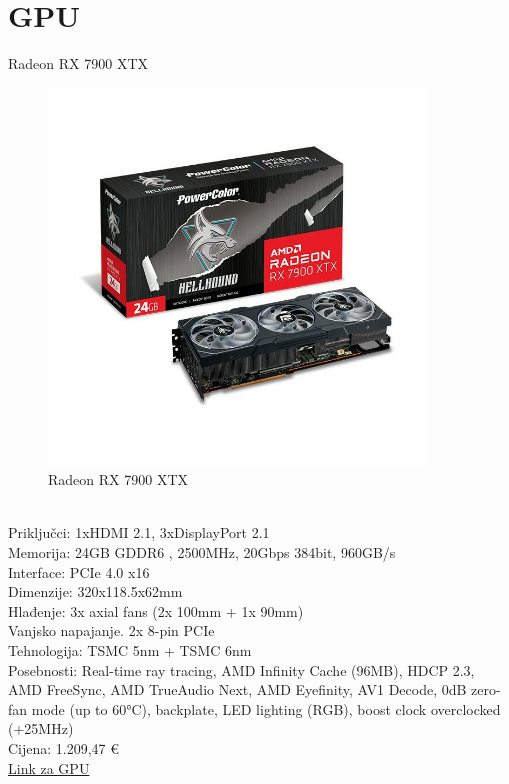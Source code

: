 \documentclass{article}
\begin{document}
\section{GPU}
Radeon RX 7900 XTX
\begin{figure}[h]
    \includegraphics[width=10cm]{rx7900.jpg}
    \caption{Radeon RX 7900 XTX}
\end{figure}\\
Priključci: 1xHDMI 2.1, 3xDisplayPort 2.1\\
Memorija: 24GB GDDR6 , 2500MHz, 20Gbps 384bit, 960GB/s\\
Interface: PCIe 4.0 x16\\
Dimenzije: 320x118.5x62mm\\
Hlađenje: 3x axial fans (2x 100mm + 1x 90mm)\\
Vanjsko napajanje. 2x 8-pin PCIe\\
Tehnologija: TSMC 5nm + TSMC 6nm\\
Posebnosti: Real-time ray tracing, AMD Infinity Cache (96MB), HDCP 2.3, AMD FreeSync, AMD TrueAudio Next, AMD Eyefinity, AV1 Decode, 0dB zero-fan mode (up to 60°C), backplate, LED lighting (RGB), boost clock overclocked (+25MHz)  \\
Cijena: 1.209,47 €\\
\href{https://www.adm.hr/powercolor-rx7900xtx-hellhound-24gb-gddr6-rx-7900xtx-24g-loc/76343/product/}{Link za GPU}
\end{document}
